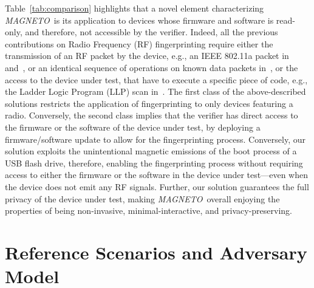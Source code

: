 \documentclass[acmsmall, authorversion]{acmart}
\newcommand{\sol}{\emph{MAGNETO}}
\begin{document}
Table~\ref{tab:comparison} highlights that a novel element characterizing \sol\ is its application to devices whose firmware and software is read-only, and therefore, not accessible by the verifier. Indeed, all the previous contributions on Radio Frequency (RF) fingerprinting require either the transmission of an RF packet by the device, e.g., an IEEE 802.11a packet in~\cite{Suski2008} and~\cite{Cobb2012_tifs}, or an identical sequence of operations on known data packets in~\cite{cobb2010}, or the access to the device under test, that have to execute a specific piece of code, e.g., the Ladder Logic Program (LLP) scan in~\cite{wright2014}. The first class of the above-described solutions restricts the application of fingerprinting to only devices featuring a radio. Conversely, the second class implies that the verifier has direct access to the firmware or the software of the device under test, by deploying a firmware/software update to allow for the fingerprinting process.
%
Conversely, our solution exploits the unintentional magnetic emissions of the boot process of a USB flash drive, therefore, enabling the fingerprinting process without requiring access to either the firmware or the software in the device under test---even when the device does not emit any RF signals. 
Further, our solution guarantees the full privacy of the device under test, making \sol\ overall enjoying the properties of being non-invasive, minimal-interactive, and privacy-preserving.

\section{Reference Scenarios and Adversary Model}
\label{sec:scenario_adv_model}
\end{document}

